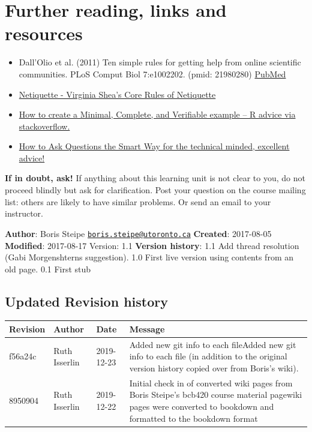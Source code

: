 \documentclass[]{book}
\providecommand{\tightlist}{%
  \setlength{\itemsep}{0pt}\setlength{\parskip}{0pt}}
\let\BeginKnitrBlock\begin \let\EndKnitrBlock\end
\begin{document}
\section{Further reading, links and
resources}\label{further-reading-links-and-resources-6}

\begin{itemize}
\tightlist
\item
  Dall'Olio et al. (2011) Ten simple rules for getting help from online
  scientific communities. PLoS Comput Biol 7:e1002202. (pmid: 21980280)
  \href{https://www.ncbi.nlm.nih.gov/pubmed/?term=21980280}{PubMed}
\item
  \href{http://www.opentextbooks.org.hk/ditatopic/4851}{Netiquette -
  Virginia Shea's Core Rules of Netiquette}
\item
  \href{https://stackoverflow.com/help/minimal-reproducible-example}{How
  to create a Minimal, Complete, and Verifiable example -- R advice via
  stackoverflow.}
\item
  \href{http://www.catb.org/~esr/faqs/smart-questions.html}{How to Ask
  Questions the Smart Way for the technical minded, excellent advice!}
\end{itemize}

\textbf{If in doubt, ask!} If anything about this learning unit is not
clear to you, do not proceed blindly but ask for clarification. Post
your question on the course mailing list: others are likely to have
similar problems. Or send an email to your instructor.

\BeginKnitrBlock{rmd-original-history}
\textbf{Author}: Boris Steipe
\href{mailto:boris.steipe@utoronto.ca}{\nolinkurl{boris.steipe@utoronto.ca}}
\textbf{Created}: 2017-08-05 \textbf{Modified}: 2017-08-17 Version: 1.1
\textbf{Version history}: 1.1 Add thread resolution (Gabi Morgenshterns
suggestion). 1.0 First live version using contents from an old page. 0.1
First stub
\EndKnitrBlock{rmd-original-history}

\subsection{Updated Revision history}\label{updated-revision-history-5}

\begin{tabular}{l|l|l|l}
\hline
Revision & Author & Date & Message\\
\hline
f56a24c & Ruth Isserlin & 2019-12-23 & Added new git info to each fileAdded new git info to each file (in addition to the original version history copied over from Boris's wiki).\\
\hline
8950904 & Ruth Isserlin & 2019-12-22 & Initial check in of converted wiki pages from Boris Steipe's bcb420 course material pagewiki pages were converted to bookdown and formatted to the bookdown format\\
\hline
\end{tabular}
\end{document}
